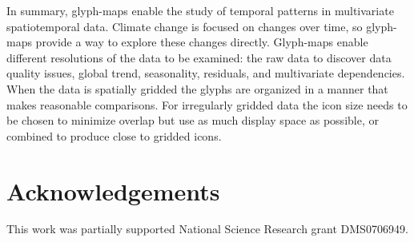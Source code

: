 \documentclass[oneside]{article}
\begin{document}
In summary, glyph-maps enable the study of temporal patterns in multivariate spatiotemporal data. Climate change is focused on changes over time, so glyph-maps provide a way to explore these changes directly. Glyph-maps enable different resolutions of the data to be examined: the raw data to discover data quality issues, global trend, seasonality, residuals, and multivariate dependencies. When the data is spatially gridded the glyphs are organized in a manner that makes reasonable comparisons. For irregularly gridded data the icon size needs to be chosen to minimize overlap but use as much display space as possible, or combined to produce close to gridded icons. 

\section*{Acknowledgements}

This work was partially supported National Science Research grant DMS0706949.


\end{document}
